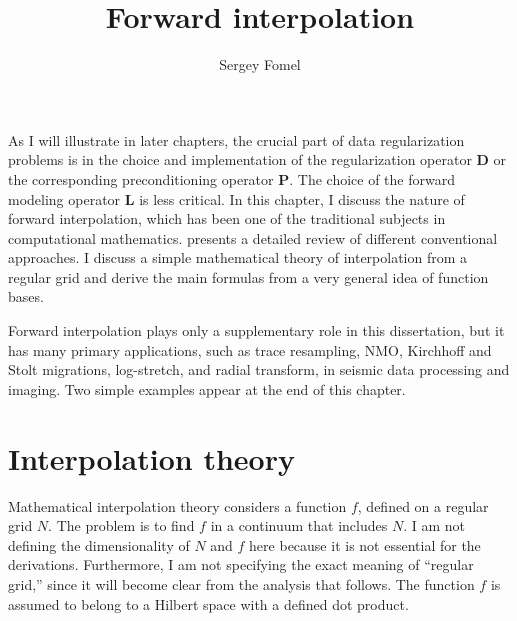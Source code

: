 
\title{Forward interpolation}


\author{Sergey Fomel}

\newtheorem{property}{Property}

\maketitle

\label{chapter:forwd}

As I will illustrate in later chapters, the crucial part of data
regularization problems is in the choice and implementation of the
regularization operator $\mathbf{D}$ or the corresponding
preconditioning operator $\mathbf{P}$. The choice of the forward
modeling operator $\mathbf{L}$ is less critical. In this chapter, I
discuss the nature of forward interpolation, which has been one of the
traditional subjects in computational mathematics. \cite{wolberg}
presents a detailed review of different conventional approaches. I
discuss a simple mathematical theory of interpolation from a regular
grid and derive the main formulas from a very general idea of function
bases.

Forward interpolation plays only a supplementary role in this
dissertation, but it has many primary applications, such as trace
resampling, NMO, Kirchhoff and Stolt migrations, log-stretch, and
radial transform, in seismic data processing and imaging. Two simple
examples appear at the end of this chapter.

\section{Interpolation theory}

Mathematical interpolation theory considers a function $f$, defined on
a regular grid $N$. The problem is to find $f$ in a continuum that
includes $N$. I am not defining the dimensionality of $N$ and $f$ here
because it is not essential for the derivations.  Furthermore, I am
not specifying the exact meaning of ``regular grid,'' since it will
become clear from the analysis that follows. The function $f$ is
assumed to belong to a Hilbert space with a defined dot product.


